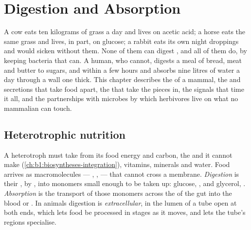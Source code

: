 \chapter{Digestion and Absorption}\label{ch:b1:digestion-absorption}

A cow eats ten kilograms of grass a day and lives on acetic acid; a
horse eats the same grass and lives, in part, on glucose; a rabbit eats
its own night droppings and would sicken without them. None of them
can digest , and all of them do, by keeping bacteria that can.
A human, who cannot, digests a meal of bread, meat and butter to
sugars,  and  within a few hours and absorbs
nine litres of water a day through a wall one  thick. This chapter
describes the  of a mammal, the  and secretions
that take food apart, the  that take the pieces in, the signals
that time it all, and the partnerships with microbes by which
herbivores live on what no mammalian  can touch.

\section{Heterotrophic nutrition}

\begin{definition}\label{def:b1:digestion-absorption:nutrition}
A heterotroph must take from its food energy and carbon, the  and  it cannot make (\cref{ch:b1:biosyntheses-integration}),
vitamins, minerals and water. Food arrives as macromolecules --- ,
,  --- that cannot cross a membrane. \emph{Digestion} is
their , by , into monomers small enough to be taken
up: glucose, ,  and glycerol, .
\emph{Absorption} is the transport of those monomers across the
 of the gut into the blood or . In animals digestion is
\emph{extracellular}, in the lumen of a tube open at both ends, which
lets food be processed in stages as it moves, and lets the tube's
regions specialise.
\end{definition}

